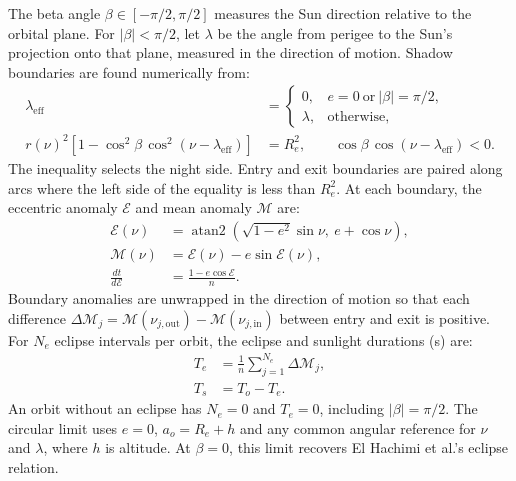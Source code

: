The beta angle $\beta\in[-\pi/2,\pi/2]$ measures the Sun direction relative to the orbital plane. For $|\beta|<\pi/2$, let $\lambda$ be the angle from perigee to the Sun's projection onto that plane, measured in the direction of motion. Shadow boundaries are found numerically from:
\begin{align}
    \lambda_{\mathrm{eff}}&=\begin{cases}
        0, & e=0\ \text{or}\ |\beta|=\pi/2,\\
        \lambda, & \text{otherwise},
    \end{cases}
    \label{eq:effective-sun-projection-angle} \\
    r(\nu)^2\left[1-\cos^2\beta\,\cos^2(\nu-\lambda_{\mathrm{eff}})\right]
    &=R_e^2,\qquad \cos\beta\,\cos(\nu-\lambda_{\mathrm{eff}})<0.
    \label{eq:eclipse-geometry}
\end{align}
The inequality selects the night side. Entry and exit boundaries are paired along arcs where the left side of the equality is less than $R_e^2$. At each boundary, the eccentric anomaly $\mathcal E$ and mean anomaly $\mathcal M$ are:
\begin{align}
    \mathcal E(\nu) &= \operatorname{atan2}\!\left(\sqrt{1-e^2}\sin\nu,\ e+\cos\nu\right),
    \label{eq:eccentric-anomaly} \\
    \mathcal M(\nu) &= \mathcal E(\nu)-e\sin\mathcal E(\nu),
    \label{eq:mean-anomaly} \\
    \frac{dt}{d\mathcal E} &= \frac{1-e\cos\mathcal E}{n}.
    \label{eq:orbital-time-weight}
\end{align}
Boundary anomalies are unwrapped in the direction of motion so that each difference $\Delta\mathcal M_j=\mathcal M(\nu_{j,\mathrm{out}})-\mathcal M(\nu_{j,\mathrm{in}})$ between entry and exit is positive. For $N_e$ eclipse intervals per orbit, the eclipse and sunlight durations (s) are:
\begin{align}
    T_e &= \frac{1}{n}\sum_{j=1}^{N_e}\Delta\mathcal M_j,
    \label{eq:eclipse-period} \\
    T_s &= T_o-T_e.
    \label{eq:sunlight-period}
\end{align}
An orbit without an eclipse has $N_e=0$ and $T_e=0$, including $|\beta|=\pi/2$. The circular limit uses $e=0$, $a_o=R_e+h$ and any common angular reference for $\nu$ and $\lambda$, where $h$ is altitude. At $\beta=0$, this limit recovers El Hachimi et al.'s eclipse relation.

